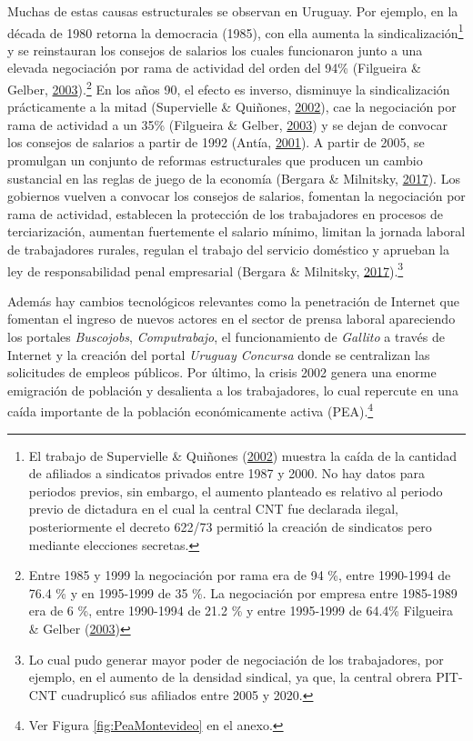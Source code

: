 \documentclass[12pt,oneside]{reedthesis}
\begin{document}
Muchas de estas causas estructurales se observan en Uruguay. Por ejemplo, en la década de 1980 retorna la democracia (1985), con ella aumenta la sindicalización\footnote{El trabajo de Supervielle \& Quiñones (\protect\hyperlink{ref-Quinones2001}{2002}) muestra la caída de la cantidad de afiliados a sindicatos privados entre 1987 y 2000. No hay datos para periodos previos, sin embargo, el aumento planteado es relativo al periodo previo de dictadura en el cual la central CNT fue declarada ilegal, posteriormente el decreto 622/73 permitió la creación de sindicatos pero mediante elecciones secretas.} y se reinstauran los consejos de salarios los cuales funcionaron junto a una elevada negociación por rama de actividad del orden del 94\% (Filgueira \& Gelber, \protect\hyperlink{ref-Filgueira2003}{2003}).\footnote{Entre 1985 y 1999 la negociación por rama era de 94 \%, entre 1990-1994 de 76.4 \% y en 1995-1999 de 35 \%. La negociación por empresa entre 1985-1989 era de 6 \%, entre 1990-1994 de 21.2 \% y entre 1995-1999 de 64.4\% Filgueira \& Gelber (\protect\hyperlink{ref-Filgueira2003}{2003})} En los años 90, el efecto es inverso, disminuye la sindicalización prácticamente a la mitad (Supervielle \& Quiñones, \protect\hyperlink{ref-Quinones2001}{2002}), cae la negociación por rama de actividad a un 35\% (Filgueira \& Gelber, \protect\hyperlink{ref-Filgueira2003}{2003}) y se dejan de convocar los consejos de salarios a partir de 1992 (Antía, \protect\hyperlink{ref-Antia2001}{2001}). A partir de 2005, se promulgan un conjunto de reformas estructurales que producen un cambio sustancial en las reglas de juego de la economía (Bergara \& Milnitsky, \protect\hyperlink{ref-Bergara2017}{2017}). Los gobiernos vuelven a convocar los consejos de salarios, fomentan la negociación por rama de actividad, establecen la protección de los trabajadores en procesos de terciarización, aumentan fuertemente el salario mínimo, limitan la jornada laboral de trabajadores rurales, regulan el trabajo del servicio doméstico y aprueban la ley de responsabilidad penal empresarial (Bergara \& Milnitsky, \protect\hyperlink{ref-Bergara2017}{2017}).\footnote{Lo cual pudo generar mayor poder de negociación de los trabajadores, por ejemplo, en el aumento de la densidad sindical, ya que, la central obrera PIT-CNT cuadruplicó sus afiliados entre 2005 y 2020.}

Además hay cambios tecnológicos relevantes como la penetración de Internet que fomentan el ingreso de nuevos actores en el sector de prensa laboral apareciendo los portales \emph{Buscojobs}, \emph{Computrabajo}, el funcionamiento de \emph{Gallito} a través de Internet y la creación del portal \emph{Uruguay Concursa} donde se centralizan las solicitudes de empleos públicos. Por último, la crisis 2002 genera una enorme emigración de población y desalienta a los trabajadores, lo cual repercute en una caída importante de la población económicamente activa (PEA).\footnote{Ver Figura \ref{fig:PeaMontevideo} en el anexo.}
\end{document}
